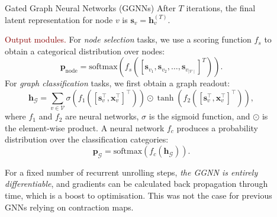 \documentclass[final,hyperref={pdfpagelabels=false}]{beamer}
\newcommand{\shrink}{-15pt}
\begin{document}
\begin{frame}[t]
\begin{columns}[t]
\begin{column}{.3\textwidth}
\begin{block}{Gated Graph Neural Networks (GGNNs)}
    After $T$ iterations, the final latent representation for node $v$ is $\mathbf{s}_v = \mathbf{h}_v^{(T)}$.
    \vspace{0.2in}
    
    \textcolor{darkred}{Output modules.} For \textit{node selection} tasks, we use a scoring function $f_s$ to obtain a categorical distribution over nodes:
        \begin{equation}
            \mathbf{p}_{\mathrm{node}} = \mathrm{softmax}\left(f_s([\mathbf{s}_{v_1}, \mathbf{s}_{v_2}, \ldots, \mathbf{s}_{v_{\mid \mathcal{V}\mid}}]^T)\right).
        \end{equation}
    For \textit{graph classification} tasks, we first obtain a graph readout:
        \begin{equation}
            \mathbf{h}_{\mathcal{G}} =
                \sum_{v\in\mathcal{V}}  
                \sigma \left(f_1\left([\mathbf{s}_v^\top, \mathbf{x}_v^\top]^\top\right)\right)
                \odot
                \tanh \left(f_2\left([\mathbf{s}_v^\top, \mathbf{x}_v^\top]^\top\right)\right),
        \end{equation}
        where $f_1$ and $f_2$ are neural networks, $\sigma$ is the sigmoid function, and $\odot$ is the element-wise product. A neural network $f_c$ produces a probability distribution over the classification categories:
        \begin{equation}
            \mathbf{p}_{\mathcal{G}} = \mathrm{softmax}\left(f_c\left(\mathbf{h}_{\mathcal{G}}\right)\right).
        \end{equation}
    
    For a fixed number of recurrent unrolling steps, \textit{the GGNN is entirely differentiable}, and gradients can be calculated back propagation through time, which is a boost to optimisation. This was not the case for previous GNNs relying on contraction maps.

    \end{block}
    
  \end{column} %


  \begin{column}{.02\textwidth}\end{column} %

  \begin{column}{.3\textwidth} %
    \vspace{\shrink}
    

\end{column}
\end{columns}
\end{frame}
\end{document}
